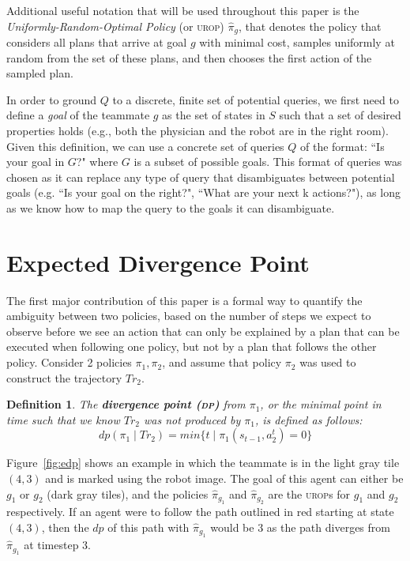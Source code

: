 \documentclass[letterpaper]{article}
\newtheorem{definition}{Definition}
\begin{document}
Additional useful notation that will be used throughout this paper is the \emph{Uniformly-Random-Optimal Policy} (or \textsc{urop}) $\hat{\pi}_{g}$, that denotes the policy that considers all plans that arrive at goal $g$ with minimal cost, samples uniformly at random from the set of these plans, and then chooses the first action of the sampled plan.

In order to ground $Q$ to a discrete, finite set of potential queries, we first need to define a \emph{goal} of the teammate $g$ as the set of states in $S$ such that a set of desired properties holds (e.g., both the physician and the robot are in the right room). Given this definition, we can use a concrete set of queries $Q$ of the format: ``Is your goal in $G$?" where $G$ is a subset of possible goals. This format of queries was chosen as it can replace any type of query that disambiguates between potential goals (e.g. ``Is your goal on the right?", ``What are your next k actions?"), as long as we know how to map the query to the goals it can disambiguate.


\section{Expected Divergence Point}
The first major contribution of this paper is a formal way to quantify the ambiguity between two policies, based on the number of steps we expect to observe before we see an action that can only be explained by a plan that can be executed when following one policy, but not by a plan that follows the other policy. Consider 2 policies $\pi_1,\pi_2$, %
and assume that policy $\pi_2$ was used to construct the trajectory $Tr_2$.  %
\begin{definition}
The \textbf{divergence point (\textsc{dp})} from $\pi_1$, or the minimal point in time such that we know $Tr_2$ was not produced by $\pi_1$, is defined as follows:
\begin{equation*}
    dp(\pi_1 \mid Tr_2) = min\{t \mid \pi_1(s_{t-1}, a_2^t) = 0\}
\end{equation*}
\end{definition}

Figure~\ref{fig:edp} shows an example in which the teammate is in the light gray tile $(4,3)$ and is marked using the robot image. The goal of this agent can either be $g_1$ or $g_2$ (dark gray tiles), and the policies $\hat{\pi}_{g_1}$ and $\hat{\pi}_{g_2}$ are the \textsc{urop}s for  $g_1$ and $g_2$ respectively.
If an agent were to follow the path outlined in red starting at state $(4,3)$, then the $dp$ of this path with $\hat{\pi}_{g_1}$ would be 3 as the path diverges from $\hat{\pi}_{g_1}$ at timestep 3.
\end{document}
